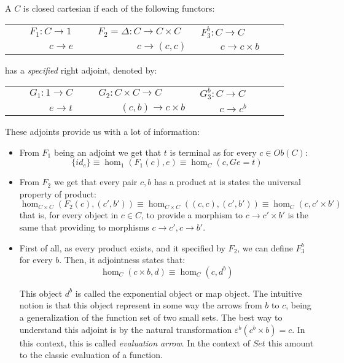   \begin{definition}\label{def:CCC}
    A $C$ is closed cartesian if each of the following functors:
\begin{center}
  \begin{tabular}{p{0.3\linewidth}p{0.3\linewidth}p{0.3\linewidth}}
    $\qquad F_1:C\to 1$&$ F_2=\Delta: C \to C\times C $&$ F_{3}^b:C \to C$\\
    $\qquad \qquad c\to e$&$ \qquad \qquad c \to  (c,c)$&$ \qquad c \to c\times b$\\
  \end{tabular}
\end{center}
has a \emph{specified} right adjoint, denoted by:
\begin{center}
  \begin{tabular}{p{0.3\linewidth}p{0.3\linewidth}p{0.3\linewidth}}
    $\qquad G_1:1\to C$&$ G_2:  C\times C\to C $&$ G_{3}^b:C \to C$\\
    $\qquad \qquad e\to t$&$ \  \qquad (c,b)\to c \times b$&$ \qquad c \to c^b$\\
  \end{tabular}
\end{center}

These adjoints provide us with a lot of information:
\begin{itemize}
\item From $F_1$ being an adjoint we get that $t$ is terminal as for every $c\in Ob(C)$:
  $$\{id_e\} \equiv \hom_1(F_1(c), e) \equiv \hom_C(c,Ge=t)   $$
\item From $F_2$ we get that every pair $c,b$ has a product at is states the universal property of product:
  $$\hom_{C\times C}(F_2(c), (c',b'))\equiv \hom_{C\times C}((c,c), (c',b')) \equiv \hom_C(c,c'\times b')$$
  that is, for every object in $c\in C$, to provide a morphism to $c\to c'\times b'$ is the same that providing to morphisms $c\to c',c\to b'$.
\item First of all, as every product exists, and it specified by $F_2$, we can define $F_3^b$ for every $b$. Then, it adjointness states that:
  $$\hom_C(c\times b, d) \equiv \hom_C(c,d^b)   $$

  This object $d^b$ is called the exponential object or map object. The intuitive notion is that this object represent in some way the arrows from $b$ to $c$, being a generalization of the function set of two small sets. The best way to understand this adjoint is by the natural transformation $\varepsilon^b(c^b\times b) = c$. In this context, this is called \emph{evaluation arrow}. In the context of $Set$ this amount to the classic evaluation of a function.\\


\end{itemize}
\end{definition}
